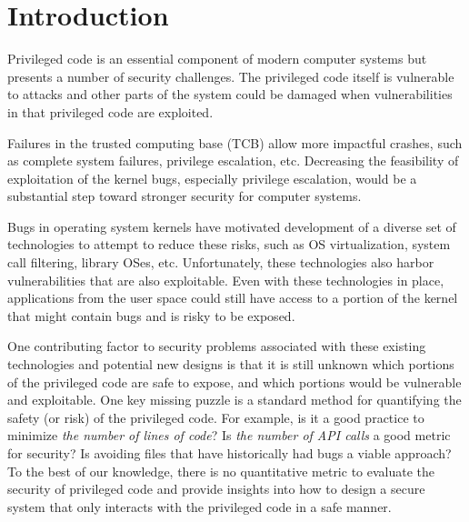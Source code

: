 \section{Introduction}
\label{sec.introduction}


Privileged code  is an essential 
component of modern computer systems but 
presents a number of security challenges. The privileged code itself is vulnerable 
to attacks and other parts of the system could be damaged when vulnerabilities in 
that privileged code are exploited.

Failures in the trusted computing base (TCB) allow more impactful crashes, 
such as complete system failures, privilege escalation, etc. 
Decreasing the feasibility of exploitation of the kernel bugs, especially privilege escalation, 
would be a substantial step toward stronger security for computer systems.

Bugs in operating system kernels have motivated development of a diverse set of
technologies to attempt to reduce these risks, such as OS virtualization, 
system call filtering, library OSes, etc.   Unfortunately, these technologies 
also harbor vulnerabilities that are also exploitable. 
Even with these technologies in place, applications from the user space 
could still have access to a portion of the kernel that might contain 
bugs and is risky to be exposed. 

One contributing factor to security problems associated with these existing technologies and potential
new designs is that it is still unknown which portions of the privileged code are
safe to expose, and which portions would be vulnerable and exploitable. 
One key missing puzzle is a standard method for quantifying the safety (or 
risk) of the privileged code. 
For example, is it a good practice to minimize \textit{the number of lines of code}?
Is \textit{the number of API calls} a good metric for security?  
Is avoiding files that have historically had bugs a viable approach?
To the best of our knowledge, there is no quantitative metric  to evaluate the 
security of privileged code  and provide 
insights into how to design a secure system that only interacts with the privileged code in a safe manner.


